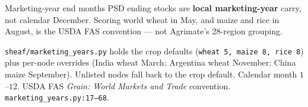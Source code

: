 \begin{frame}{Marketing-year end months}
PSD ending stocks are \textbf{local marketing-year} carry, not calendar
December. Scoring world wheat in May, and maize and rice in August, is the
USDA FAS convention --- not Agrimate's 28-region grouping.

\texttt{sheaf/marketing\_years.py} holds the crop defaults
(\texttt{wheat 5, maize 8, rice 8}) plus per-node overrides (India wheat
March; Argentina wheat November; China maize September). Unlisted nodes
fall back to the crop default.
{Calendar month $1$--$12$.}
{USDA FAS \emph{Grain: World Markets and Trade} convention.
\texttt{marketing\_years.py:17--68}.}
\end{frame}
